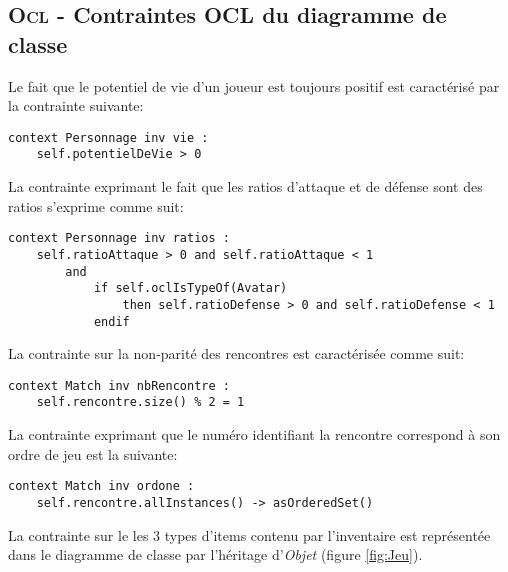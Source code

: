 
\subsection{\textsc{Ocl} - Contraintes OCL du diagramme de classe}
\label{sec:question-4}


Le fait que le potentiel de vie d'un joueur est toujours positif est caractérisé par la contrainte suivante:

\begin{lstlisting}[caption=Contrainte sur le potentiel de vie,captionpos=b,label={lst:vie},language=OCL]
context Personnage inv vie :
	self.potentielDeVie > 0
\end{lstlisting}

La contrainte exprimant le fait que les ratios d'attaque et de défense sont des ratios s'exprime comme suit:

\begin{lstlisting}[caption=Contrainte sur les ratios,captionpos=b,label={lst:ratios},language=OCL]
context Personnage inv ratios :
	self.ratioAttaque > 0 and self.ratioAttaque < 1
		and
			if self.oclIsTypeOf(Avatar)
				then self.ratioDefense > 0 and self.ratioDefense < 1
			endif
\end{lstlisting}

La contrainte sur la non-parité des rencontres est caractérisée comme suit:

\begin{lstlisting}[caption=Contrainte sur la non-parité des rencontres,captionpos=b,label={lst:impair},language=OCL]
context Match inv nbRencontre :
	self.rencontre.size() % 2 = 1
\end{lstlisting}

La contrainte exprimant que le numéro identifiant la rencontre correspond à son ordre de jeu est la suivante:

\begin{lstlisting}[caption=Contrainte sur l'ordre des rencontres,captionpos=b,label={lst:ordreRencontres},language=OCL]
context Match inv ordone :
	self.rencontre.allInstances() -> asOrderedSet()
\end{lstlisting}

La contrainte sur le les 3 types d'items contenu par l'inventaire est représentée dans le diagramme de classe par l'héritage d'\emph{Objet} (figure \ref{fig:Jeu}).

\vspace*{2cm}


